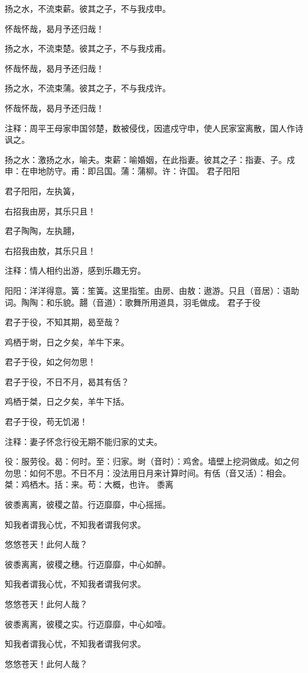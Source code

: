 \documentclass[12pt,UTF8]{ctexbook}
\begin{document}
扬之水，不流束薪。彼其之子，不与我戍申。

怀哉怀哉，曷月予还归哉！

扬之水，不流束楚。彼其之子，不与我戍甫。

怀哉怀哉，曷月予还归哉！

扬之水，不流束蒲。彼其之子，不与我戍许。

怀哉怀哉，曷月予还归哉！

注释：周平王母家申国邻楚，数被侵伐，因遣戍守申，使人民家室离散，国人作诗讽之。

扬之水：激扬之水，喻夫。束薪：喻婚姻，在此指妻。彼其之子：指妻、子。戍申：在申地防守。甫：即吕国。蒲：蒲柳。许：许国。 君子阳阳

君子阳阳，左执簧，

右招我由房，其乐只且！

君子陶陶，左执翿，

右招我由敖，其乐只且！

注释：情人相约出游，感到乐趣无穷。

阳阳：洋洋得意。簧：笙簧。这里指笙。由房、由敖：遨游。只且（音居）：语助词。陶陶：和乐貌。翿（音道）：歌舞所用道具，羽毛做成。 君子于役

君子于役，不知其期，曷至哉？

鸡栖于埘，日之夕矣，羊牛下来。

君子于役，如之何勿思！

君子于役，不日不月，曷其有佸？

鸡栖于桀，日之夕矣，羊牛下括。

君子于役，苟无饥渴！

注释：妻子怀念行役无期不能归家的丈夫。

役：服劳役。曷：何时。至：归家。埘（音时）：鸡舍。墙壁上挖洞做成。如之何勿思：如何不思。不日不月：没法用日月来计算时间。有佸（音又活）：相会。桀：鸡栖木。括：来。苟：大概，也许。 黍离

彼黍离离，彼稷之苗。行迈靡靡，中心摇摇。

知我者谓我心忧，不知我者谓我何求。

悠悠苍天！此何人哉？

彼黍离离，彼稷之穗。行迈靡靡，中心如醉。

知我者谓我心忧，不知我者谓我何求。

悠悠苍天！此何人哉？

彼黍离离，彼稷之实。行迈靡靡，中心如噎。

知我者谓我心忧，不知我者谓我何求。

悠悠苍天！此何人哉？
\end{document}
